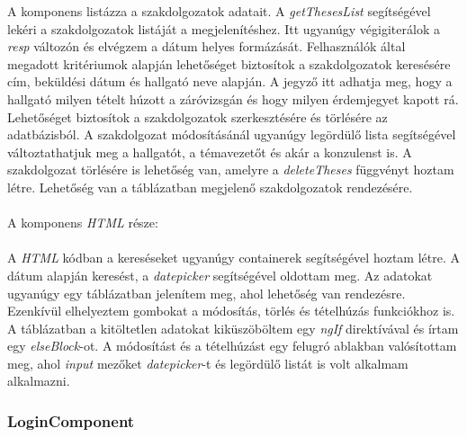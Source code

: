 A komponens listázza a szakdolgozatok adatait. A \textit{getThesesList} segítségével lekéri a szakdolgozatok listáját a megjelenítéshez. Itt ugyanúgy végigiterálok a \textit{resp} változón és elvégzem a dátum helyes formázását. Felhasználók által megadott kritériumok alapján lehetőséget biztosítok a szakdolgozatok keresésére cím, beküldési dátum és hallgató neve alapján. A jegyző itt adhatja meg, hogy a hallgató milyen tételt húzott a záróvizsgán és hogy milyen érdemjegyet kapott rá. Lehetőséget biztosítok a szakdolgozatok szerkesztésére és törlésére az adatbázisból. A szakdolgozat módosításánál ugyanúgy legördülő lista segítségével változtathatjuk meg a hallgatót, a témavezetőt és akár a konzulenst is. A szakdolgozat törlésére is lehetőség van, amelyre a \textit{deleteTheses} függvényt hoztam létre. Lehetőség van a táblázatban megjelenő szakdolgozatok rendezésére. \\
\\
A komponens \textit{HTML} része:\\
\\
A \textit{HTML} kódban a kereséseket ugyanúgy containerek segítségével hoztam létre.
A dátum alapján keresést, a \textit{datepicker} segítségével oldottam meg. Az adatokat ugyanúgy egy táblázatban jelenítem meg, ahol lehetőség van rendezésre. Ezenkívül elhelyeztem gombokat a módosítás, törlés és tételhúzás funkciókhoz is. A táblázatban a kitöltetlen adatokat kiküszöböltem egy \textit{ngIf} direktívával és írtam egy \textit{elseBlock}-ot. A módosítást és a tételhúzást egy felugró ablakban valósítottam meg, ahol \textit{input} mezőket \textit{datepicker}-t és legördülő listát is volt alkalmam alkalmazni.


\subsubsection{LoginComponent}

